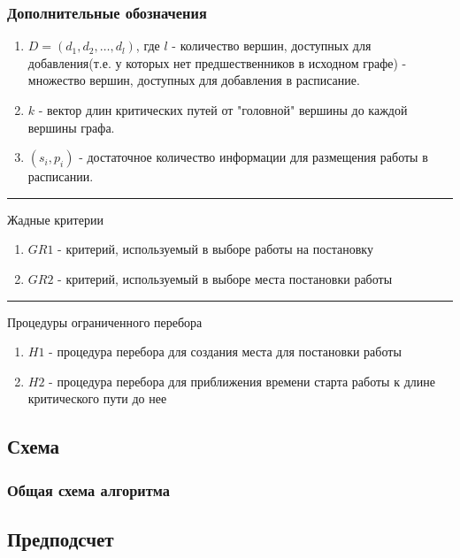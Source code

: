 \begin{frame}
    \frametitle{Дополнительные обозначения}
    \begin{enumerate}
        \item $D= \left( d_1, d_2, \dots, d_l \right)$, где $l$ - количество вершин, доступных для добавления(т.е. у которых нет предшественников в исходном графе) - множество вершин, доступных для добавления в расписание.
        \item $k$ - вектор длин критических путей от "головной" вершины до каждой вершины графа.
        \item $\left( s_i, p_i \right)$ - достаточное количество информации для размещения работы в расписании.
    \end{enumerate}
    \hrule
    \vspace{2pt}
    Жадные критерии
    \begin{enumerate}
        \item $GR1$ - критерий, используемый в выборе работы на постановку
        \item $GR2$ - критерий, используемый в выборе места постановки работы
    \end{enumerate}
    \hrule
    \vspace{2pt}
    Процедуры ограниченного перебора
    \begin{enumerate}
        \item $H1$ - процедура перебора для создания места для постановки работы
        \item $H2$ - процедура перебора для приближения времени старта работы к длине критического пути до нее
    \end{enumerate}
\end{frame}

\subsection{Схема}
\begin{frame}
    \frametitle{Общая схема алгоритма}
    {\tiny
    }
\end{frame}

\subsection{Предподсчет}


